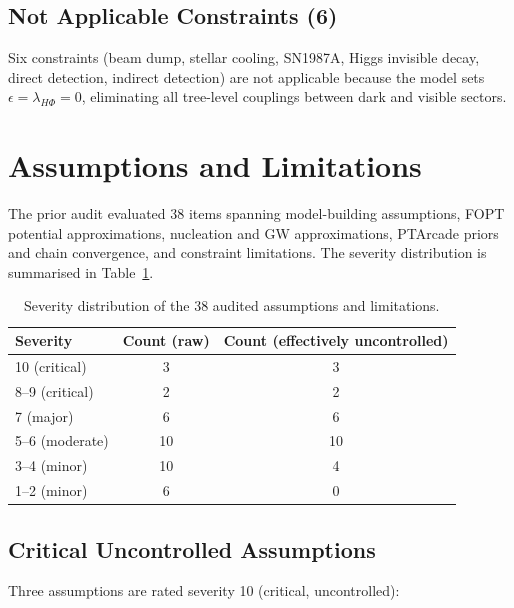 \documentclass[12pt,a4paper]{article}
\begin{document}
\subsection{Not Applicable Constraints (6)}

Six constraints (beam dump, stellar cooling, SN1987A, Higgs invisible decay, direct detection, indirect detection) are not applicable because the model sets $\epsilon = \lambda_{H\Phi} = 0$, eliminating all tree-level couplings between dark and visible sectors.

\section{Assumptions and Limitations}
\label{sec:assumptions}

The prior audit evaluated 38 items spanning model-building assumptions, FOPT potential approximations, nucleation and GW approximations, PTArcade priors and chain convergence, and constraint limitations. The severity distribution is summarised in Table~\ref{tab:severity}.

\begin{table}[H]
\centering
\caption{Severity distribution of the 38 audited assumptions and limitations.}
\label{tab:severity}
\begin{tabular}{lcc}
\toprule
Severity & Count (raw) & Count (effectively uncontrolled) \\
\midrule
10 (critical) & 3 & 3 \\
8--9 (critical) & 2 & 2 \\
7 (major) & 6 & 6 \\
5--6 (moderate) & 10 & 10 \\
3--4 (minor) & 10 & 4 \\
1--2 (minor) & 6 & 0 \\
\bottomrule
\end{tabular}
\end{table}

\subsection{Critical Uncontrolled Assumptions}

Three assumptions are rated severity 10 (critical, uncontrolled):
\end{document}
